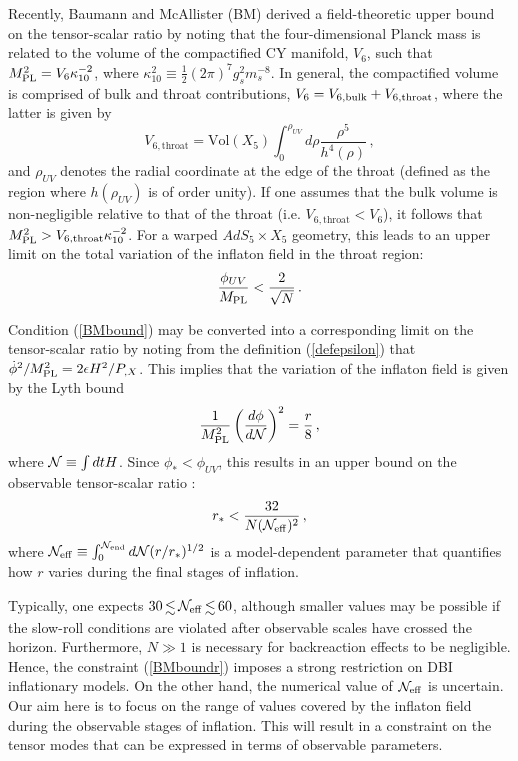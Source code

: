 Recently, Baumann and McAllister (BM) \cite{bmpaper} 
derived a field-theoretic upper bound on the tensor-scalar ratio 
by noting that the four-dimensional Planck mass is related 
to the volume of the compactified CY manifold, $V_6$, such that 
$M_{\mathrm{PL}}^2=V_6 \kappa_{10}^{-2}$, where $\kappa_{10}^2 \equiv 
\frac{1}{2} (2\pi )^7 g_s^2 m_s^{-8}$. In general, the compactified volume 
is comprised of bulk and throat contributions, 
$V_6 = V_{6,{\rm bulk}}+V_{6,{\rm throat}}$, where the latter is 
given by
\begin{equation}
\label{throatvolume}
V_{6,\mathrm{throat}} = \mathrm{Vol}(X_5)  
\int_0^{\rho_{UV}} d\rho \frac{\rho^5}{h^4(\rho )} \,,
\end{equation}
and $\rho_{UV}$ denotes the radial coordinate at 
the edge of the throat (defined as the region 
where $h (\rho_{UV})$ is of order unity). 
If one assumes that the bulk volume is 
non-negligible relative to 
that of the throat (i.e. $V_{6,\mathrm{throat}} < V_{6}$), 
it follows that $M_{\mathrm{PL}}^2> V_{6,\mathrm{throat}}\kappa_{10}^{-2}$. 
For a warped $AdS_5 \times X_5$ geometry, this leads to an 
upper limit on the total variation of the inflaton field in 
the throat region:
\begin{equation}
\label{BMbound}
\frac{\phi_{UV}}{M_{\mathrm{PL}}}   < \frac{2}{\sqrt{N}} \,.
\end{equation}

Condition (\ref{BMbound}) may be converted into a 
corresponding limit on the tensor-scalar ratio by noting from 
the definition (\ref{defepsilon})
that $\dot{\phi}^2 /M_{\mathrm{PL}}^2 = 2\epsilon H^2/P_{,X}$.
This implies that the variation of the inflaton field 
is given by the Lyth bound 
\cite{lyth,bmpaper}
\begin{equation}
\label{rtheory}
\frac{1}{M_{\mathrm{PL}}^2} \left( \frac{d\phi}{d {\cal{N}}} \right)^2 =
\frac{r}{8} \,,
\end{equation}
where ${\cal{N}} \equiv \int dt H$. 
Since $\phi_* < \phi_{UV}$, this 
results in an upper bound on the observable tensor-scalar ratio
\cite{bmpaper}: 
\begin{equation}
\label{BMboundr}
r_*  < \frac{32}{N ({\cal{N}}_{\mathrm{eff}})^2} \,,
\end{equation}
where ${\cal{N}}_{\mathrm{eff}} \equiv 
\int^{{\cal{N}}_{\mathrm{end}}}_0 d {\cal{N}} (r/r_*)^{1/2}$ 
is a model-dependent parameter that quantifies 
how $r$ varies during the final stages of inflation.  

Typically, one expects $30 \, \lsim \, {{\cal{N}}_{\mathrm{eff}}} 
\, \lsim \, 60$, 
although smaller values may be possible if the slow-roll conditions are 
violated after observable scales have crossed the horizon. 
Furthermore, $N \gg 1$ is necessary 
for backreaction effects to be negligible. Hence, the 
constraint (\ref{BMboundr}) 
imposes a strong restriction on DBI inflationary models. 
On the other hand, the numerical value 
of ${\cal{N}}_{\mathrm{eff}}$ is uncertain.  
Our aim here is to focus on the range of values covered by the 
inflaton field during the observable stages of inflation. 
This will result in a constraint on the tensor modes that 
can be expressed in terms of observable parameters.  


